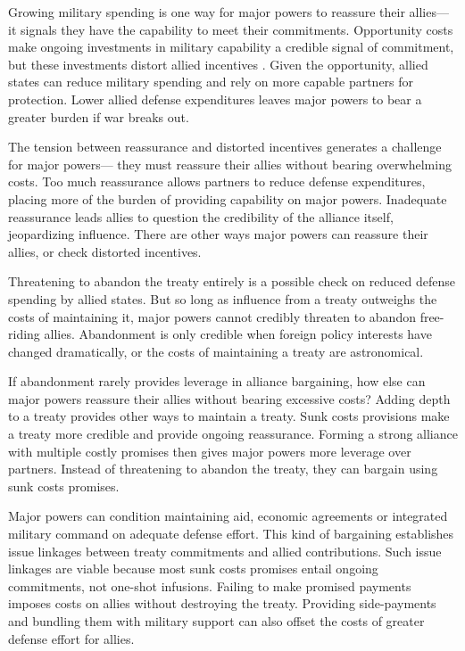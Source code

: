 \documentclass[12pt]{article}
\begin{document}
Growing military spending is one way for major powers to reassure their allies--- it signals they have the capability to meet their commitments. 
Opportunity costs make ongoing investments in military capability a credible signal of commitment, but these investments distort allied incentives \citep{Lake1996, Lake2009}. 
Given the opportunity, allied states can reduce military spending and rely on more capable partners for protection.
Lower allied defense expenditures leaves major powers to bear a greater burden if war breaks out. 


The tension between reassurance and distorted incentives generates a challenge for major powers--- they must reassure their allies without bearing overwhelming costs.
Too much reassurance allows partners to reduce defense expenditures, placing more of the burden of providing capability on major powers. 
Inadequate reassurance leads allies to question the credibility of the alliance itself, jeopardizing influence.   
There are other ways major powers can reassure their allies, or check distorted incentives. 


Threatening to abandon the treaty entirely is a possible check on reduced defense spending by allied states. 
But so long as influence from a treaty outweighs the costs of maintaining it, major powers cannot credibly threaten to abandon free-riding allies. 
Abandonment is only credible when foreign policy interests have changed dramatically, or the costs of maintaining a treaty are astronomical. 


If abandonment rarely provides leverage in alliance bargaining, how else can major powers reassure their allies without bearing excessive costs? 
Adding depth to a treaty provides other ways to maintain a treaty.
Sunk costs provisions make a treaty more credible and provide ongoing reassurance. 
Forming a strong alliance with multiple costly promises then gives major powers more leverage over partners. 
Instead of threatening to abandon the treaty, they can bargain using sunk costs promises. 


Major powers can condition maintaining aid, economic agreements or integrated military command on adequate defense effort.
This kind of bargaining establishes issue linkages between treaty commitments and allied contributions. 
Such issue linkages are viable because most sunk costs promises entail ongoing commitments, not one-shot infusions. 
Failing to make promised payments imposes costs on allies without destroying the treaty. 
Providing side-payments and bundling them with military support can also offset the costs of greater defense effort for allies. 
\end{document}
